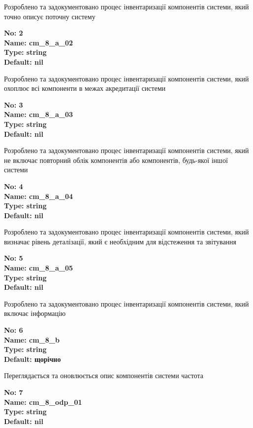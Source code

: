 \documentclass{article}
\begin{document}
{\footnotesize Розроблено та задокументовано процес інвентаризації компонентів системи, який точно описує поточну систему}


{\footnotesize\bfseries
No: 2\\
Name: cm\_\allowbreak{}8\_\allowbreak{}a\_\allowbreak{}02\\
Type: string\\
Default: nil
}

{\footnotesize Розроблено та задокументовано процес інвентаризації компонентів системи, який охоплює всі компоненти в межах акредитації системи}


{\footnotesize\bfseries
No: 3\\
Name: cm\_\allowbreak{}8\_\allowbreak{}a\_\allowbreak{}03\\
Type: string\\
Default: nil
}

{\footnotesize Розроблено та задокументовано процес інвентаризації компонентів системи, який не включає повторний облік компонентів або компонентів, будь-якої іншої системи}


{\footnotesize\bfseries
No: 4\\
Name: cm\_\allowbreak{}8\_\allowbreak{}a\_\allowbreak{}04\\
Type: string\\
Default: nil
}

{\footnotesize Розроблено та задокументовано процес інвентаризації компонентів системи, який визначає рівень деталізації, який є необхідним для відстеження та звітування}


{\footnotesize\bfseries
No: 5\\
Name: cm\_\allowbreak{}8\_\allowbreak{}a\_\allowbreak{}05\\
Type: string\\
Default: nil
}

{\footnotesize Розроблено та задокументовано процес інвентаризації компонентів системи, який включає інформацію}


{\footnotesize\bfseries
No: 6\\
Name: cm\_\allowbreak{}8\_\allowbreak{}b\\
Type: string\\
Default: \textquotedbl{}щорічно\textquotedbl{}
}

{\footnotesize Переглядається та оновлюється опис компонентів системи частота}


{\footnotesize\bfseries
No: 7\\
Name: cm\_\allowbreak{}8\_\allowbreak{}odp\_\allowbreak{}01\\
Type: string\\
Default: nil
}
\end{document}
